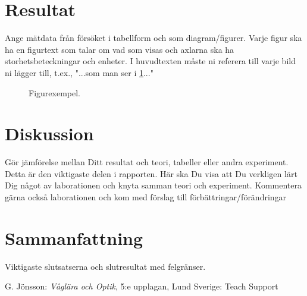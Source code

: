 \documentclass[conference]{IEEEtran}
\begin{document}

\section{Resultat}
Ange mätdata från försöket i tabellform och som diagram/figurer. Varje figur ska ha en figurtext som talar om vad som visas och axlarna ska ha storhetsbeteckningar och enheter. I huvudtexten måste ni referera till varje bild ni lägger till, t.ex., "...som man ser i \ref{exempel}..."

\begin{figure}[h]
    \begin{center}
    \end{center}
    \caption{Figurexempel.}
    \label{exempel}
\end{figure}


\section{Diskussion}
Gör jämförelse mellan Ditt resultat och teori, tabeller eller andra experiment. Detta är den viktigaste delen i rapporten. Här ska Du visa att Du verkligen lärt Dig något av laborationen och knyta samman teori och experiment. Kommentera gärna också laborationen och kom med förslag till förbättringar/förändringar


\section{Sammanfattning}
Viktigaste slutsatserna och slutresultat med felgränser.












%
% 


\begin{thebibliography}{77}
	
G. Jönsson: \emph{Våglära och Optik}, 5:e upplagan, Lund Sverige: Teach Support


\end{thebibliography}
\end{document}
